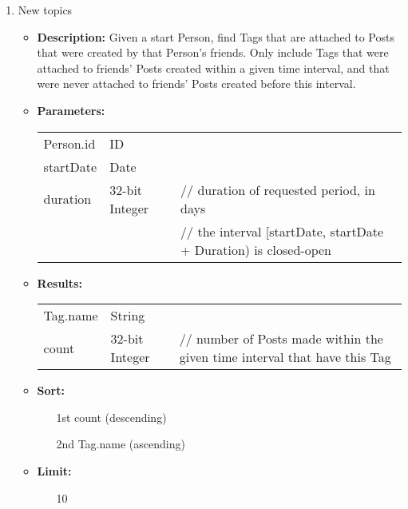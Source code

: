 {\begin{enumerate}
        \item New topics
            \begin{itemize}
                \item \textbf{Description:}
                    Given a start Person, find Tags that are attached to Posts that
                    were created by that Person's friends.  Only include Tags that were
                    attached to friends' Posts created within a given time interval, and that
                    were never attached to friends' Posts created before this interval.
                \item \textbf{Parameters:} \\
                    \begin{tabular}{lll}
                        Person.id 										& ID 	& \\
                        startDate 										& Date & \\
                        duration										& 32-bit Integer 					& // duration of requested period, in days \\
                                          &                                   & // the interval [startDate, startDate + Duration) is closed-open\\
                    \end{tabular}
                \item \textbf{Results:} \\
                    \begin{tabular}{lll}
                        Tag.name 										& String 	& \\
                        count 											& 32-bit Integer & // number of Posts made within the given time interval that have this Tag \\
                    \end{tabular}
                \item \textbf{Sort:}
                  \begin{itemize}
                    \item[1st] count (descending)
                    \item[2nd] Tag.name (ascending)
                  \end{itemize}
                        \item \textbf{Limit:}
                          \begin{itemize}
                            \item[] 10
                          \end{itemize}
            \end{itemize}


\end{enumerate}}
